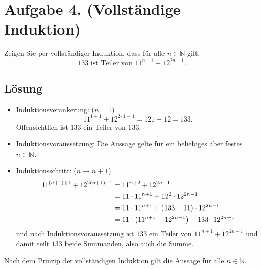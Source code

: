 \documentclass[german,12pt]{homework}
\newcommand{\NN}{\mathbb{N}}
\DeclarePairedDelimiter{\enbrace}{(}{)}
\begin{document}
    \section*{Aufgabe 4. (Vollständige Induktion)}

    \begin{problem}
        Zeigen Sie per vollständiger Induktion, dass für alle \(n \in \NN\) gilt:
        \[133\text{ ist Teiler von }11^{n + 1} + 12^{2n - 1}.\]
    \end{problem}

    \subsection*{Lösung}
    \begin{itemize}
        \item Induktionsverankerung: (\(n = 1\))
        \[11^{1 + 1} + 12^{2 \cdot 1 - 1} = 121 + 12 = 133.\]
        Offensichtlich ist \(133\) ein Teiler von \(133\).
        \item Induktionsvoraussetzung: Die Aussage gelte für ein beliebiges aber festes \(n \in \NN\).
        \item Induktionsschritt: (\(n \to n + 1\))
        \begin{align*}
            11^{\enbrace*{n + 1} + 1} + 12^{2\enbrace*{n + 1} - 1} &= 11^{n + 2} + 12^{2n + 1}\\
            &= 11 \cdot 11^{n + 1} + 12^2 \cdot 12^{2n - 1}\\
            &= 11 \cdot 11^{n + 1} + \enbrace*{133 + 11} \cdot 12^{2n - 1}\\
            &= 11 \cdot \enbrace*{11^{n + 1} + 12^{2n - 1}} + 133 \cdot 12^{2n - 1}
        \end{align*}
        und nach Induktionsvoraussetzung ist \(133\) ein Teiler von \(11^{n + 1} + 12^{2n - 1}\) und damit teilt \(133\) beide Summanden, also auch die Summe.
    \end{itemize}
    Nach dem Prinzip der vollständigen Induktion gilt die Aussage für alle \(n \in \NN\).
\end{document}

